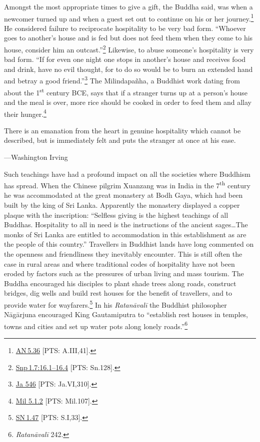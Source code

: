 \documentclass[10pt, openright]{book}
\newenvironment{epigram-2}%
{%
\setstretch{1.4}
\vspace{1em}
\noindent
\quoting[leftmargin=2cm,rightmargin=2cm]%
\begin{itshape}
\large
}%
{\end{itshape}\endquoting
}%
\newenvironment{epigram-2-cite}%
{%
\quoting[leftmargin=2cm,rightmargin=2cm]%
\noindent\normal\hspace*{\fill} 
}%
{\endquoting
}%
\begin{document}
Amongst the most appropriate times to give a gift, the Buddha said, was when a newcomer turned up and when a guest set out to continue on his or her journey.\footnote {\href{https://suttacentral.net/an5.36/en/sujato}{AN 5.36} [PTS: A.III,41].} He considered failure to reciprocate hospitality to be very bad form. “Whoever goes to another’s house and is fed but does not feed them when they come to his house, consider him an outcast.”\footnote {\href{https://suttacentral.net/snp1.7/en/sujato\#16.1}{Snp 1.7:16.1–16.4} [PTS: Sn.128].} Likewise, to abuse someone’s hospitality is very bad form. “If for even one night one stops in another’s house and receives food and drink, have no evil thought, for to do so would be to burn an extended hand and betray a good friend.”\footnote {\href{https://suttacentral.net/ja546/en/cowell-rouse?reference=main/pts#pts-vp-pli310}{Ja 546} [PTS: Ja.VI,310].} The Milindapañha, a Buddhist work dating from about the 1\textsuperscript{st} century BCE, says that if a stranger turns up at a person’s house and the meal is over, more rice should be cooked in order to feed them and allay their hunger.\footnote {\href{https://suttacentral.net/mil5.1.2/en/tw_rhysdavids?reference=main/pts#pts-vp-pli107}{Mil 5.1.2} [PTS: Mil.107].}


\begin{epigram-2}
There is an emanation from the heart in genuine hospitality which cannot be described, but is immediately felt and puts the stranger at once at his ease.
\end{epigram-2}
\begin{epigram-2-cite}
—Washington Irving
\end{epigram-2-cite}

Such teachings have had a profound impact on all the societies where Buddhism has spread. When the Chinese pilgrim Xuanzang was in India in the 7\textsuperscript{th} century he was accommodated at the great monastery at Bodh Gaya, which had been built by the king of Sri Lanka. Apparently the monastery displayed a copper plaque with the inscription: “Selfless giving is the highest teachings of all Buddhas. Hospitality to all in need is the instructions of the ancient sages…The monks of Sri Lanka are entitled to accommodation in this establishment as are the people of this country.” Travellers in Buddhist lands have long commented on the openness and friendliness they inevitably encounter. This is still often the case in rural areas and where traditional codes of hospitality have not been eroded by factors such as the pressures of urban living and mass tourism. The Buddha encouraged his disciples to plant shade trees along roads, construct bridges, dig wells and build rest houses for the benefit of travellers, and to provide water for wayfarers.\footnote {\href{https://suttacentral.net/sn1.47/en/sujato}{SN 1.47} [PTS: S.I,33].} In his \textit{Ratanāvalī} the Buddhist philosopher Nāgārjuna encouraged King Gautamiputra to “establish rest houses in temples, towns and cities and set up water pots along lonely roads.”\footnote {\textit{Ratanāvalī} 242.}
\end{document}
